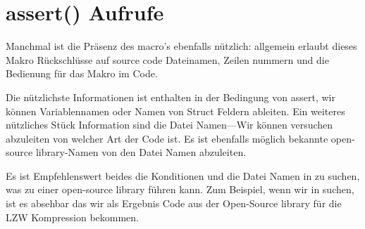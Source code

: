 \section{assert() Aufrufe}

Manchmal ist die Pr\"asenz des  macro's ebenfalls n\"utzlich:
allgemein erlaubt dieses Makro R\"uckschl\"usse auf source code Dateinamen,
Zeilen nummern und die Bedienung f\"ur das Makro im Code.

Die n\"utzlichste Informationen ist enthalten in der Bedingung von assert, wir k\"onnen Variablennamen oder Namen
von Struct Feldern ableiten. Ein weiteres n\"utzliches St\"uck Information sind die Datei Namen---Wir k\"onnen versuchen
abzuleiten von welcher Art der Code ist. 
Es ist ebenfalls m\"oglich bekannte open-source library-Namen von den Datei Namen abzuleiten.



Es ist Empfehlenswert beides die Konditionen und die Datei Namen in  zu suchen, was zu einer open-source library f\"uhren kann. 
Zum Beispiel, wenn wir  in  suchen, ist es absehbar das wir als Ergebnis Code aus der 
Open-Source library f\"ur die LZW Kompression bekommen. 
